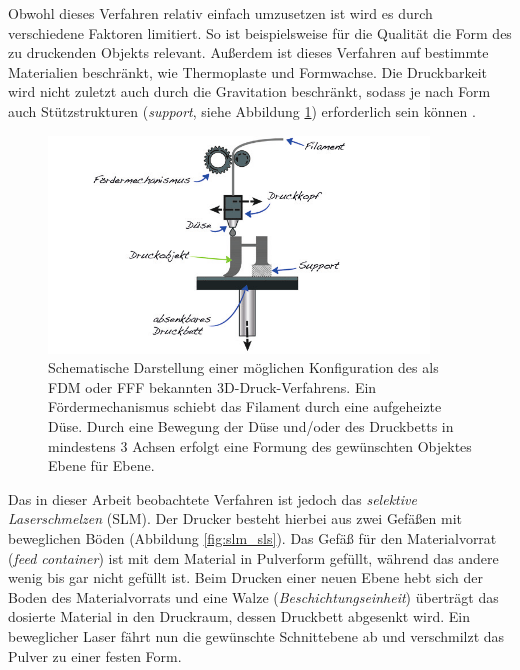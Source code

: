 		Obwohl dieses Verfahren relativ einfach umzusetzen ist wird es durch verschiedene Faktoren
		limitiert. So ist beispielsweise für die Qualität die Form des zu druckenden Objekts
		relevant. Außerdem ist dieses Verfahren auf bestimmte Materialien beschränkt, wie
		Thermoplaste und Formwachse. Die Druckbarkeit wird nicht zuletzt auch durch die
		Gravitation beschränkt, sodass je nach Form auch Stützstrukturen (\emph{support}, siehe
		Abbildung \ref{fig:fdm}) erforderlich sein können \cite{wikipedia2021fused}.

		\begin{figure}[!ht]
			\centering
			\includegraphics[width=0.9\textwidth]{chapter/main/img/fdm.png}
			\caption[Schematische Darstellung des FDM-/FFF-Verfahrens]{Schematische Darstellung
			einer möglichen Konfiguration des als FDM oder FFF bekannten 3D-Druck-Verfahrens. Ein
			Fördermechanismus schiebt das Filament durch eine aufgeheizte Düse. Durch eine
			Bewegung der Düse und/oder des Druckbetts in mindestens 3 Achsen erfolgt eine Formung
			des gewünschten Objektes Ebene für Ebene. \cite[S. 114]{horsch20143d}}
			\label{fig:fdm}
		\end{figure}

		Das in dieser Arbeit beobachtete Verfahren ist jedoch das \emph{selektive Laserschmelzen}
		(SLM). Der Drucker besteht hierbei aus zwei Gefäßen mit beweglichen Böden (Abbildung
		\ref{fig:slm_sls}). Das Gefäß für den Materialvorrat (\emph{feed container}) ist mit dem
		Material in Pulverform gefüllt, während das andere wenig bis gar nicht gefüllt ist. Beim
		Drucken einer neuen Ebene hebt sich der Boden des Materialvorrats und eine Walze
		(\emph{Beschichtungseinheit}) überträgt das dosierte Material in den Druckraum, dessen
		Druckbett abgesenkt wird. Ein beweglicher Laser fährt nun die gewünschte Schnittebene ab
		und verschmilzt das Pulver zu einer festen Form.

